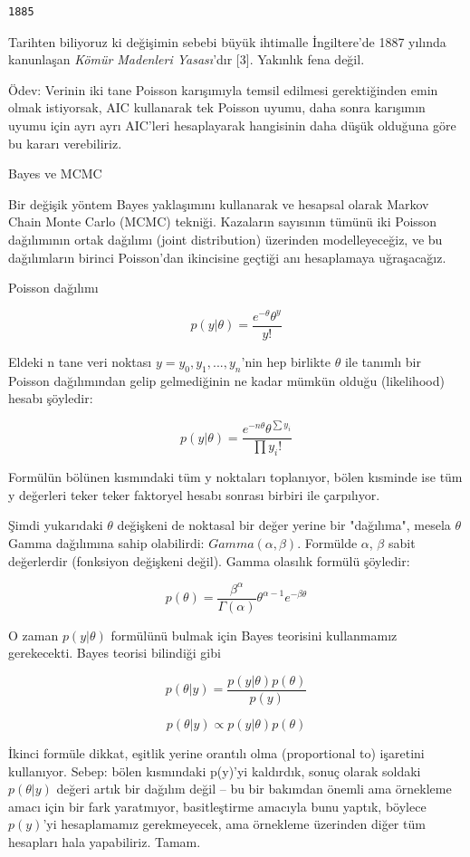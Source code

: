 \documentclass[12pt,fleqn]{article}\usepackage{../../common}
\begin{document}
\begin{verbatim}
1885
\end{verbatim}

Tarihten biliyoruz ki değişimin sebebi büyük ihtimalle İngiltere'de 1887
yılında kanunlaşan {\em Kömür Madenleri Yasası}'dır [3]. Yakınlık fena
değil.

Ödev: Verinin iki tane Poisson karışımıyla temsil edilmesi gerektiğinden
emin olmak istiyorsak, AIC kullanarak tek Poisson uyumu, daha sonra
karışımın uyumu için ayrı ayrı AIC'leri hesaplayarak hangisinin daha düşük
olduğuna göre bu kararı verebiliriz.

Bayes ve MCMC 

Bir değişik yöntem Bayes yaklaşımını kullanarak ve hesapsal olarak Markov
Chain Monte Carlo (MCMC) tekniği. Kazaların sayısının tümünü iki Poisson
dağılımının ortak dağılımı (joint distribution) üzerinden modelleyeceğiz,
ve bu dağılımların birinci Poisson'dan ikincisine geçtiği anı hesaplamaya
uğraşacağız.

Poisson dağılımı

$$ p(y|\theta) = \frac{e^{-\theta}\theta^y}{y!} $$

Eldeki n tane veri noktası $y=y_0, y_1,...,y_n$'nin hep birlikte
$\theta$ ile tanımlı bir Poisson dağılımından gelip gelmediğinin ne
kadar mümkün olduğu (likelihood) hesabı şöyledir:

$$ p(y|\theta) = \frac{e^{-n\theta}\theta^{\sum y_i}}{\prod y_i!}  $$

Formülün bölünen kısmındaki tüm y noktaları toplanıyor, bölen kısminde
ise tüm y değerleri teker teker faktoryel hesabı sonrası birbiri ile
çarpılıyor.

Şimdi yukarıdaki $\theta$ değişkeni de noktasal bir değer yerine bir
"dağılıma", mesela $\theta$ Gamma dağılımına sahip olabilirdi:
$Gamma(\alpha, \beta)$. Formülde $\alpha$, $\beta$ sabit değerlerdir
(fonksiyon değişkeni değil). Gamma olasılık formülü şöyledir:

$$ p(\theta) = \frac{\beta^\alpha}{\Gamma(\alpha)}\theta^{\alpha-1}e^{-\beta\theta} $$

O zaman $p(y|\theta)$ formülünü bulmak için Bayes teorisini
kullanmamız gerekecekti. Bayes teorisi bilindiği gibi

$$ p(\theta|y) = \frac{p(y|\theta)p(\theta)}{p(y)} $$

$$ p(\theta|y) \propto p(y|\theta)p(\theta) $$

İkinci formüle dikkat, eşitlik yerine orantılı olma (proportional to)
işaretini kullanıyor. Sebep: bölen kısmındaki p(y)'yi kaldırdık, sonuç
olarak soldaki $p(\theta|y)$ değeri artık bir dağılım değil -- bu bir
bakımdan önemli ama örnekleme amacı için bir fark yaratmıyor,
basitleştirme amacıyla bunu yaptık, böylece $p(y)$'yi hesaplamamız
gerekmeyecek, ama örnekleme üzerinden diğer tüm hesapları hala
yapabiliriz. Tamam.
\end{document}
